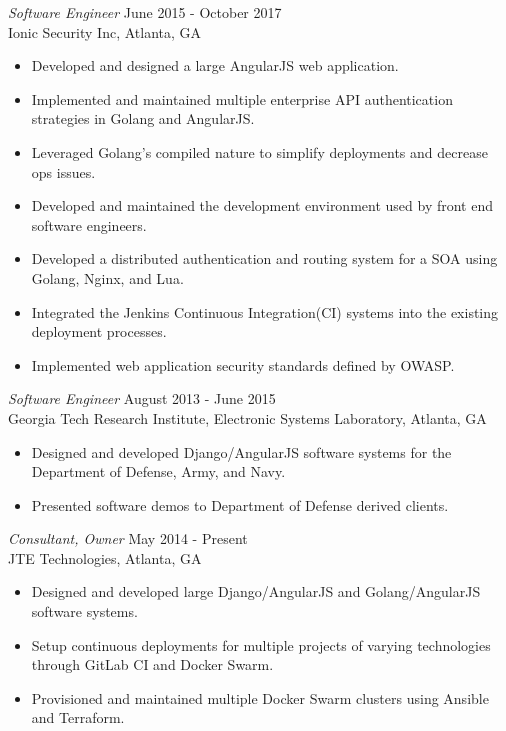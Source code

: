 \documentclass[margin, 10pt]{res} %
\begin{document}
\begin{resume}
{\sl Software Engineer} \hfill June 2015 - October 2017 \\
Ionic Security Inc, Atlanta, GA
\begin{itemize}
\item Developed and designed a large AngularJS web application.
\item Implemented and maintained multiple enterprise API authentication strategies in Golang and AngularJS.
\item Leveraged Golang's compiled nature to simplify deployments and decrease ops issues.
\item Developed and maintained the development environment used by front end software engineers.
\item Developed a distributed authentication and routing system for a SOA using Golang, Nginx, and Lua.
\item Integrated the Jenkins Continuous Integration(CI) systems into the existing deployment processes.
\item Implemented web application security standards defined by OWASP.
\end{itemize} 

{\sl Software Engineer} \hfill August 2013 - June 2015 \\
Georgia Tech Research Institute, Electronic Systems Laboratory, Atlanta, GA 
\begin{itemize} \itemsep -2pt %
\item Designed and developed Django/AngularJS software systems for the Department of Defense, Army, and Navy.
\item Presented software demos to Department of Defense derived clients.
\end{itemize}
 
{\sl Consultant, Owner} \hfill May 2014 - Present\\
JTE Technologies, Atlanta, GA
\begin{itemize} 
\item Designed and developed large Django/AngularJS and Golang/AngularJS software systems.
\item Setup continuous deployments for multiple projects of varying technologies through GitLab CI and Docker Swarm.
\item Provisioned and maintained multiple Docker Swarm clusters using Ansible and Terraform.
\end{itemize} 




\end{resume}
\end{document}
